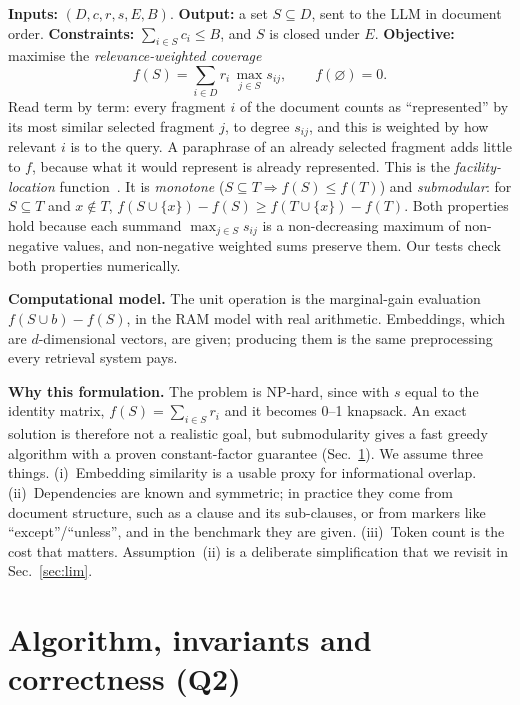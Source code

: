 \documentclass[10pt,a4paper]{article}
\newcommand{\cost}{c}
\begin{document}
\textbf{Inputs:} $(D, \cost, r, s, E, B)$. \textbf{Output:} a set $S\subseteq D$, sent to the LLM in document order.
\textbf{Constraints:} $\sum_{i\in S}\cost_i\le B$, and $S$ is closed under $E$.
\textbf{Objective:} maximise the \emph{relevance-weighted coverage}
\begin{equation}
f(S)=\sum_{i\in D} r_i\,\max_{j\in S} s_{ij},\qquad f(\varnothing)=0. \label{eq:f}
\end{equation}
Read term by term: every fragment $i$ of the document counts as ``represented'' by its most similar selected fragment $j$, to degree $s_{ij}$, and this is weighted by how relevant $i$ is to the query. A paraphrase of an already selected fragment adds little to $f$, because what it would represent is already represented. This is the \emph{facility-location} function~\cite{lin2011}. It is \emph{monotone} ($S\subseteq T\Rightarrow f(S)\le f(T)$) and \emph{submodular}: for $S\subseteq T$ and $x\notin T$, $f(S\cup\{x\})-f(S)\ge f(T\cup\{x\})-f(T)$. Both properties hold because each summand $\max_{j\in S}s_{ij}$ is a non-decreasing maximum of non-negative values, and non-negative weighted sums preserve them. Our tests check both properties numerically.

\textbf{Computational model.} The unit operation is the marginal-gain evaluation $f(S\cup b)-f(S)$, in the RAM model with real arithmetic. Embeddings, which are $d$-dimensional vectors, are given; producing them is the same preprocessing every retrieval system pays.

\textbf{Why this formulation.} The problem is NP-hard, since with $s$ equal to the identity matrix, $f(S)=\sum_{i\in S}r_i$ and it becomes 0--1 knapsack. An exact solution is therefore not a realistic goal, but submodularity gives a fast greedy algorithm with a proven constant-factor guarantee (Sec.~\ref{sec:alg}). We assume three things. (i)~Embedding similarity is a usable proxy for informational overlap. (ii)~Dependencies are known and symmetric; in practice they come from document structure, such as a clause and its sub-clauses, or from markers like ``except''/``unless'', and in the benchmark they are given. (iii)~Token count is the cost that matters. Assumption~(ii) is a deliberate simplification that we revisit in Sec.~\ref{sec:lim}.

\section{Algorithm, invariants and correctness (Q2)}\label{sec:alg}
\end{document}
